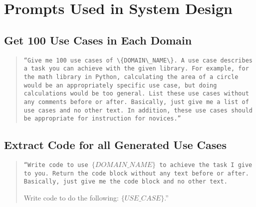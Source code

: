 \section{Prompts Used in System Design}
\label{sec:appendix-pipeline}



\subsection{Get 100 Use Cases in Each Domain} 
\label{sec:use_case_prompt}


\begin{quote}
    \tt ``Give me 100 use cases of $\{DOMAIN\_NAME\}$. A use case describes a task you can achieve with the given library. For example, for the math library in Python, calculating the area of a circle would be an appropriately specific use case, but doing calculations would be too general. List these use cases without any comments before or after. Basically, just give me a list of use cases and no other text. In addition, these use cases should be appropriate for instruction for novices.''
\end{quote}

\subsection{Extract Code for all Generated Use Cases}
\label{sec:code_prompt}


\begin{quote}
    \tt ``Write code to use $\{DOMAIN\_NAME\}$ to achieve the task I give to you. Return the code block without any text before or after. Basically, just give me the code block and no other text. 
    
    Write code to do the following: $\{USE\_CASE\}$.''
\end{quote}

